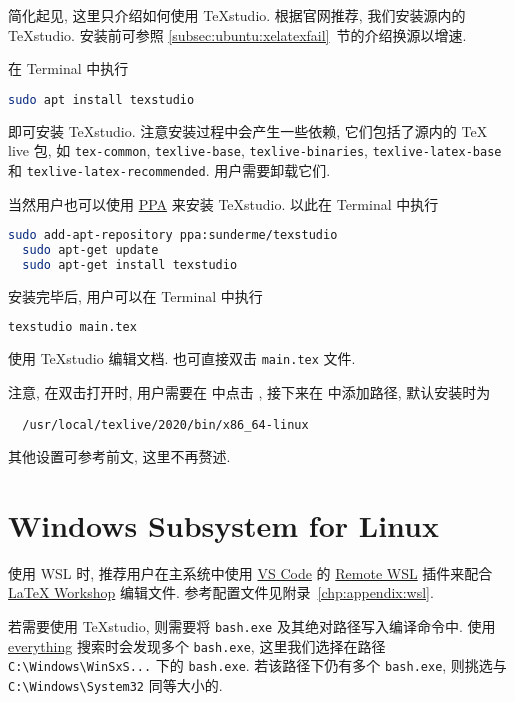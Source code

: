 简化起见, 这里只介绍如何使用 \TeX studio.
根据官网推荐, 我们安装源内的 \TeX studio.
安装前可参照 \ref{subsec:ubuntu:xelatexfail}~节的介绍换源以增速.

在 \textsf{Terminal} 中执行
\begin{lstlisting}[language = bash]
  sudo apt install texstudio
\end{lstlisting}
即可安装 \TeX studio.
注意安装过程中会产生一些依赖, 它们包括了源内的 \TeX{} live 包, 如 \texttt{tex-common}, \texttt{texlive-base}, \texttt{texlive-binaries}, \texttt{texlive-latex-base} 和 \texttt{texlive-latex-recommended}.
用户需要卸载它们.

当然用户也可以使用
\href{https://code.launchpad.net/~sunderme/+archive/ubuntu/texstudio}{PPA}
来安装 \TeX studio.
以此在 \textsf{Terminal} 中执行
\begin{lstlisting}[language = bash]
  sudo add-apt-repository ppa:sunderme/texstudio
  sudo apt-get update
  sudo apt-get install texstudio
\end{lstlisting}

安装完毕后,
用户可以在 \textsf{Terminal} 中执行
\begin{lstlisting}[language = bash]
  texstudio main.tex
\end{lstlisting}
使用 \TeX studio 编辑文档.
也可直接双击 \texttt{main.tex} 文件.

注意, 在双击打开时, 用户需要在
 中点击
,
接下来在 
中添加路径,
默认安装时为
\begin{lstlisting}
  /usr/local/texlive/2020/bin/x86_64-linux
\end{lstlisting}

其他设置可参考前文, 这里不再赘述.

\section{Windows Subsystem for Linux}

使用 WSL 时,
推荐用户在主系统中使用
\href{https://code.visualstudio.com/}{VS Code}
的
\href{https://marketplace.visualstudio.com/items?itemName=ms-vscode-remote.remote-wsl}{Remote WSL}
插件来配合
\href{https://marketplace.visualstudio.com/items?itemName=James-Yu.latex-workshop}{\LaTeX{} Workshop}
编辑文件.
参考配置文件见附录~\ref{chp:appendix:wsl}.

若需要使用 \TeX studio,
则需要将 \texttt{bash.exe} 及其绝对路径写入编译命令中.
使用
\href{https://www.voidtools.com/zh-cn/}{everything}
搜索时会发现多个 \texttt{bash.exe},
这里我们选择在路径
\texttt{C:\textbackslash Windows\textbackslash WinSxS...}
下的 \texttt{bash.exe}.
若该路径下仍有多个 \texttt{bash.exe},
则挑选与
\texttt{C:\textbackslash Windows\textbackslash System32}
同等大小的.

